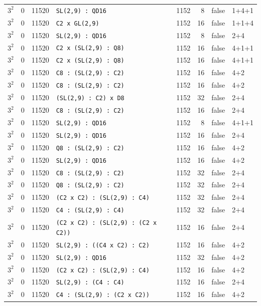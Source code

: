 \begin{longtable}{llrlrrll}
$3^2$ & 0 & 11520 & \texttt{SL(2,9) : QD16} & 1152 & 8 & false & 1+4+1\\
$3^2$ & 0 & 11520 & \texttt{C2 x GL(2,9)} & 1152 & 16 & false & 1+1+4\\
$3^2$ & 0 & 11520 & \texttt{SL(2,9) : QD16} & 1152 & 8 & false & 2+4\\
$3^2$ & 0 & 11520 & \texttt{C2 x (SL(2,9) : Q8)} & 1152 & 16 & false & 4+1+1\\
$3^2$ & 0 & 11520 & \texttt{C2 x (SL(2,9) : Q8)} & 1152 & 16 & false & 4+1+1\\
$3^2$ & 0 & 11520 & \texttt{C8 : (SL(2,9) : C2)} & 1152 & 16 & false & 4+2\\
$3^2$ & 0 & 11520 & \texttt{C8 : (SL(2,9) : C2)} & 1152 & 16 & false & 4+2\\
$3^2$ & 0 & 11520 & \texttt{(SL(2,9) : C2) x D8} & 1152 & 32 & false & 2+4\\
$3^2$ & 0 & 11520 & \texttt{C8 : (SL(2,9) : C2)} & 1152 & 16 & false & 2+4\\
$3^2$ & 0 & 11520 & \texttt{SL(2,9) : QD16} & 1152 & 8 & false & 4+1+1\\
$3^2$ & 0 & 11520 & \texttt{SL(2,9) : QD16} & 1152 & 16 & false & 2+4\\
$3^2$ & 0 & 11520 & \texttt{Q8 : (SL(2,9) : C2)} & 1152 & 16 & false & 4+2\\
$3^2$ & 0 & 11520 & \texttt{SL(2,9) : QD16} & 1152 & 16 & false & 4+2\\
$3^2$ & 0 & 11520 & \texttt{C8 : (SL(2,9) : C2)} & 1152 & 32 & false & 2+4\\
$3^2$ & 0 & 11520 & \texttt{Q8 : (SL(2,9) : C2)} & 1152 & 32 & false & 2+4\\
$3^2$ & 0 & 11520 & \texttt{(C2 x C2) : (SL(2,9) : C4)} & 1152 & 32 & false & 2+4\\
$3^2$ & 0 & 11520 & \texttt{C4 : (SL(2,9) : C4)} & 1152 & 32 & false & 2+4\\
$3^2$ & 0 & 11520 & \texttt{(C2 x C2) : (SL(2,9) : (C2 x C2))} & 1152 & 16 & false & 2+4\\
$3^2$ & 0 & 11520 & \texttt{SL(2,9) : ((C4 x C2) : C2)} & 1152 & 16 & false & 4+2\\
$3^2$ & 0 & 11520 & \texttt{SL(2,9) : QD16} & 1152 & 32 & false & 4+2\\
$3^2$ & 0 & 11520 & \texttt{(C2 x C2) : (SL(2,9) : C4)} & 1152 & 16 & false & 4+2\\
$3^2$ & 0 & 11520 & \texttt{SL(2,9) : (C4 : C4)} & 1152 & 16 & false & 2+4\\
$3^2$ & 0 & 11520 & \texttt{C4 : (SL(2,9) : (C2 x C2))} & 1152 & 16 & false & 4+2\\

\end{longtable}
